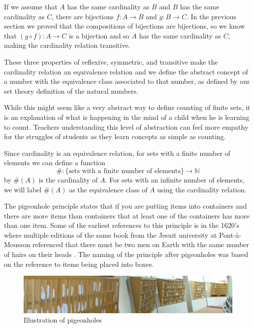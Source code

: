 \documentclass[
]{book}
\theoremstyle{definition}
\theoremstyle{definition}
\theoremstyle{definition}
\theoremstyle{remark}
\begin{document}
If we assume that \(A\) has the same cardinality as \(B\) and \(B\) has the same cardinality as \(C\), there are bijections \(f:A\rightarrow B\) and \(g:B\rightarrow C\). In the previous section we proved that the compositions of bijections are bijections, so we know that \((g\circ f):A\rightarrow C\) is a bijection and so \(A\) has the same cardinality as \(C\), making the cardinality relation transitive.

These three properties of reflexive, symmetric, and transitive make the cardinality relation an equivalence relation and we define the abstract concept of a number with the equivalence class associated to that number, as defined by our set theory definition of the natural numbers.

While this might seem like a very abstract way to define counting of finite sets, it is an explanation of what is happening in the mind of a child when he is learning to count. Teachers understanding this level of abstraction can feel more empathy for the struggles of students as they learn concepts as simple as counting.

Since cardinality is an equivalence relation, for sets with a finite number of elements we can define a function \[\#: \mbox{\{sets with a finite number of elements\}}\rightarrow \mathbb{N}\] by \(\#(A)\) is the cardinality of \(A\). For sets with an infinite number of elements, we will label \(\#(A)\) as the equivalence class of \(A\) using the cardinality relation.

The pigeonhole principle states that if you are putting items into containers and there are more items than containers that at least one of the containers has more than one item. Some of the earliest references to this principle is in the 1620's where multiple editions of the same book from the Jesuit university at Pont-à-Mousson referenced that there must be two men on Earth with the same number of hairs on their heads \citep{Leurechon}. The naming of the principle after pigeonholes was based on the reference to items being placed into boxes.

\begin{figure}

{\centering \includegraphics[width=1\linewidth]{images/Pigeon-hole-messagebox-4} 

}

\caption{Illustration of pigeonholes}\label{fig:pigeon2}
\end{figure}
\end{document}
